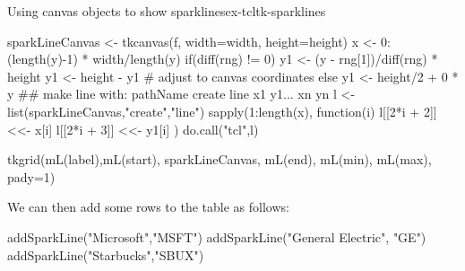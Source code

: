 \begin{example}{Using canvas objects to show sparklines}{ex-tcltk-sparklines}
\begin{Schunk}
\begin{Sinput}
{   sparkLineCanvas <- tkcanvas(f, width=width, height=height)
   x <- 0:(length(y)-1) * width/length(y)
   if(diff(rng) != 0) {
     y1 <- (y - rng[1])/diff(rng) * height
     y1 <- height - y1   # adjust to canvas coordinates
   } else {
     y1 <- height/2 + 0 * y
   }
   ## make line with: pathName create line x1 y1... xn yn 
   l <- list(sparkLineCanvas,"create","line")
   sapply(1:length(x), function(i) {
     l[[2*i + 2]] <<- x[i]
     l[[2*i + 3]] <<- y1[i]
   })
   do.call("tcl",l)
 
   tkgrid(mL(label),mL(start), sparkLineCanvas, 
          mL(end), mL(min), mL(max), pady=1)
 }
\end{Sinput}
\end{Schunk}

We can then add some rows to the table as follows:
\begin{Schunk}
\begin{Sinput}
 addSparkLine("Microsoft","MSFT")
 addSparkLine("General Electric", "GE")
 addSparkLine("Starbucks","SBUX")
\end{Sinput}
\end{Schunk}
\end{example}

